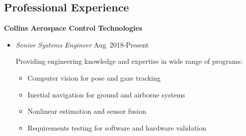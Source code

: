 \subsection*{Professional Experience}
{}

\textbf{Collins Aerospace Control Technologies}

\begin{itemize}
    \item[] \textit{Senior Systems Engineer} \hfill {Aug~2018-Present} 

        Providing engineering knowledge and expertise in wide range of programs:
        \begin{itemize}
            \item Computer vision for pose and gaze tracking
            \item Inertial navigation for ground and airborne systems
            \item Nonlinear estimation and sensor fusion 
            \item Requirements testing for software and hardware validation
        \end{itemize}
\end{itemize}

